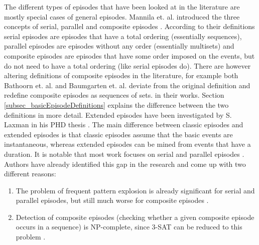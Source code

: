 The different types of episodes that have been looked at in the literature are mostly special cases of general episodes. Mannila et. al. introduced the three concepts of serial, parallel and composite episodes \cite{mannila1995discovering}. According to their definitions serial episodes are episodes that have a total ordering (essentially sequences), parallel episodes are episodes without any order (essentially multisets) and composite episodes are episodes that have some order imposed on the events, but do not need to have a total ordering (like serial episodes do). There are however altering definitions of composite episodes in the literature, for example both Bathoorn et. al. \cite{bathoorn2007finding} and Baumgarten et. al. \cite{baumgarten2003tree} deviate from the original definition and redefine composite episodes as sequences of sets. in their works. Section \ref{subsec_basicEpisodeDefinitions} explains the difference between the two definitions in more detail. Extended episodes have been investigated by S. Laxman in his PHD thesis \cite{laxman2006discovering}. The main difference between classic episodes and extended episodes is that classic episodes assume that the basic events are instantaneous, whereas extended episodes can be mined from events that have a duration. It is notable that most work focuses on serial and parallel episodes \cite{mannila1995discovering} \cite{mannila1997discovery} \cite{laxman2006discovering} \cite{laxman2007fast}. Authors have already identified this gap in the research and come up with two different reasons:
\begin{enumerate}
	\item The problem of frequent pattern explosion is already significant for serial and parallel episodes, but still much worse for composite episodes \cite{bathoorn2007finding}.
	\item Detection of composite episodes (checking whether a given composite episode occurs in a sequence) is NP-complete, since 3-SAT can be reduced to this problem \cite{tatti2011mining}.
\end{enumerate}

